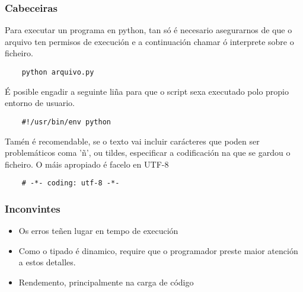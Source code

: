 \begin{frame}[fragile]
  \frametitle{Cabeceiras}
  Para executar un programa en python, tan só é necesario asegurarnos de que o
  arquivo ten permisos de execución e a continuación chamar ó interprete sobre o
  ficheiro.
  \small
  \begin{verbatim}
    python arquivo.py
  \end{verbatim}
  \normalsize
  É posible engadir a seguinte liña para que o script sexa executado polo propio
  entorno de usuario.
  \small
  \begin{verbatim}
    #!/usr/bin/env python 
  \end{verbatim}
  \normalsize
  Tamén é recomendable, se o texto vai incluir carácteres que poden ser
  problemáticos coma 'ñ', ou tildes, especificar a codificación na que se gardou
  o ficheiro. O máis apropiado é facelo en UTF-8
  \begin{verbatim}
    # -*- coding: utf-8 -*-
  \end{verbatim}
  \normalsize
\end{frame}

\begin{frame}
  \frametitle{Inconvintes}
  \begin{itemize}
  \item Os erros teñen lugar en tempo de execución
  \item Como o tipado é dinamico, require que o programador preste maior
    atención a estos detalles.
  \item Rendemento, principalmente na carga de código
  \end{itemize}
\end{frame}
